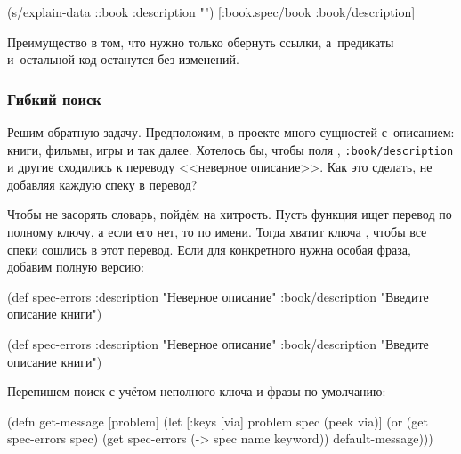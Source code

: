 \else

\begin{clojure}
(s/explain-data ::book {:description ""})
[:book.spec/book :book/description]
\end{clojure}

\fi

Преимущество  в том, что нужно только обернуть ссылки, а~предикаты
и~остальной код останутся без изменений.

\subsubsection*{Гибкий поиск}

Решим обратную задачу. Предположим, в проекте много сущностей с~описанием:
книги, фильмы, игры и так далее. Хотелось бы, чтобы поля
, \texttt{:book/descrip\-tion} и другие сходились к
переводу <<неверное описание>>. Как это сделать, не добавляя каждую спеку в
перевод?

Чтобы не засорять словарь, пойдём на хитрость. Пусть функция ищет перевод по
полному ключу, а если его нет, то по имени. Тогда хватит ключа
, чтобы все спеки сошлись в этот перевод. Если для
конкретного  нужна особая фраза, добавим полную
версию:

\ifnarrow

\begin{clojure}
(def spec-errors
  {:description
   "Неверное описание"
   :book/description
   "Введите описание книги"})
\end{clojure}

\else

\begin{clojure}
(def spec-errors
  {:description "Неверное описание"
   :book/description "Введите описание книги"})
\end{clojure}

\fi

Перепишем поиск с учётом неполного ключа и фразы по умолчанию:

\ifnarrow

\begin{clojure}
(defn get-message
  [problem]
  (let [{:keys [via]} problem
        spec (peek via)]
    (or (get spec-errors spec)
        (get spec-errors
          (-> spec name keyword))
        default-message)))
\end{clojure}

\else

